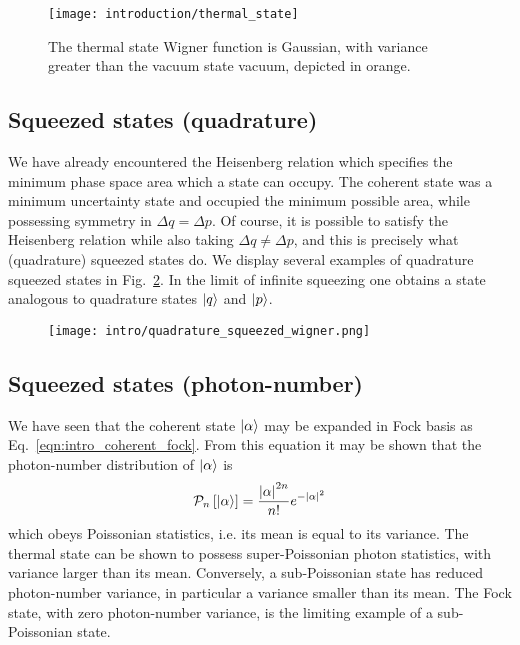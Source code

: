 \begin{figure}[htp]
\captionsetup{width=0.8\linewidth}
\centering
\texttt{[image: introduction/thermal\_state]}
\caption{\label{fig:thermal_state} The thermal state Wigner function is Gaussian, with variance greater than the vacuum state vacuum, depicted in orange.}
\end{figure}
\subsection{Squeezed states (quadrature)}
We have already encountered the Heisenberg relation which specifies the minimum phase space area which a state can occupy. The coherent state was a minimum uncertainty state and occupied the minimum possible area, while possessing symmetry in $\Delta q = \Delta p$. Of course, it is possible to satisfy the Heisenberg relation while also taking $\Delta q \ne \Delta p$, and this is precisely what (quadrature) squeezed states do. We display several examples of quadrature squeezed states in Fig.~\ref{fig:intro_quadrature_squeezed_wigner}. In the limit of infinite squeezing one obtains a state analogous to quadrature states $\ket{q}$ and $\ket{p}$.

\begin{figure}[htp]
\captionsetup{width=0.8\linewidth}
\centering
\texttt{[image: intro/quadrature\_squeezed\_wigner.png]}
\caption{\label{fig:intro_quadrature_squeezed_wigner}}
\end{figure}

\FloatBarrier
\subsection{Squeezed states (photon-number)}
We have seen that the coherent state $\ket{\alpha}$ may be expanded in Fock basis as Eq.~\ref{eqn:intro_coherent_fock}. From this equation it may be shown that the photon-number distribution of $\ket{\alpha}$ is 
\begin{equation}
\mathcal{P}_n\left[\ket{\alpha}\right] = \frac{\left|\alpha\right|^{2n}}{n!} e^{-\left|\alpha\right|^2}
\end{equation}
which obeys Poissonian statistics, i.e. its mean is equal to its variance. The thermal state can be shown to possess super-Poissonian photon statistics, with variance larger than its  mean. Conversely, a sub-Poissonian state has reduced photon-number variance, in particular a variance smaller than its mean. The Fock state, with zero photon-number variance, is the limiting example of a sub-Poissonian state.


